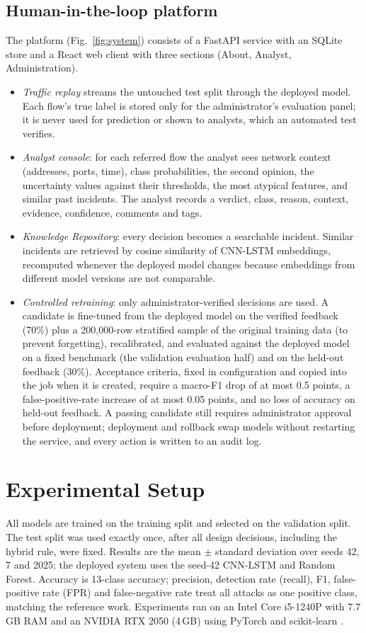 \documentclass[conference]{IEEEtran}
\begin{document}
\subsection{Human-in-the-loop platform}
The platform (Fig.~\ref{fig:system}) consists of a FastAPI service with an SQLite store and a
React web client with three sections (About, Analyst, Administration).
\begin{itemize}
\item \textit{Traffic replay} streams the untouched test split through the deployed model. Each
flow's true label is stored only for the administrator's evaluation panel; it is never used for
prediction or shown to analysts, which an automated test verifies.
\item \textit{Analyst console}: for each referred flow the analyst sees network context (addresses,
ports, time), class probabilities, the second opinion, the uncertainty values against their
thresholds, the most atypical features, and similar past incidents. The analyst records a
verdict, class, reason, context, evidence, confidence, comments and tags.
\item \textit{Knowledge Repository}: every decision becomes a searchable incident. Similar
incidents are retrieved by cosine similarity of CNN-LSTM embeddings, recomputed whenever the
deployed model changes because embeddings from different model versions are not comparable.
\item \textit{Controlled retraining}: only administrator-verified decisions are used. A candidate
is fine-tuned from the deployed model on the verified feedback (70\%) plus a 200,000-row
stratified sample of the original training data (to prevent forgetting), recalibrated, and
evaluated against the deployed model on a fixed benchmark (the validation evaluation half) and on
the held-out feedback (30\%). Acceptance criteria, fixed in configuration and copied into the job
when it is created, require a macro-F1 drop of at most 0.5 points, a false-positive-rate increase
of at most 0.05 points, and no loss of accuracy on held-out feedback. A passing candidate still
requires administrator approval before deployment; deployment and rollback swap models without
restarting the service, and every action is written to an audit log.
\end{itemize}

\section{Experimental Setup}
All models are trained on the training split and selected on the validation split. The test split
was used exactly once, after all design decisions, including the hybrid rule, were fixed. Results
are the mean $\pm$ standard deviation over seeds 42, 7 and 2025; the deployed system uses the
seed-42 CNN-LSTM and Random Forest. Accuracy is 13-class accuracy; precision, detection rate
(recall), F1, false-positive rate (FPR) and false-negative rate treat all attacks as one positive
class, matching the reference work. Experiments ran on an Intel Core i5-1240P with 7.7\,GB RAM and
an NVIDIA RTX 2050 (4\,GB) using PyTorch \cite{paszke2019pytorch} and scikit-learn
\cite{pedregosa2011scikit}.
\end{document}
